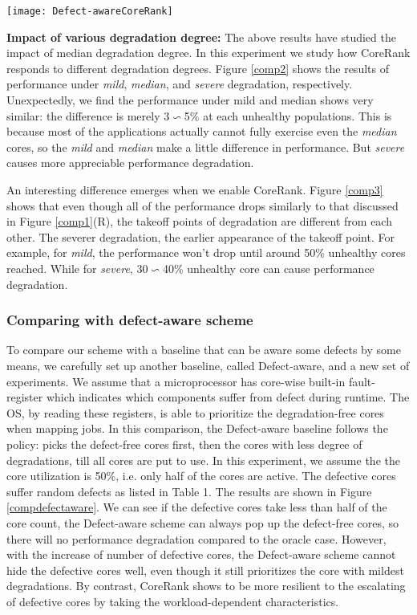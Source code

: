 \begin{figure*}[t]
 \centering
  \texttt{[image: Defect-awareCoreRank]}\\
\caption{Performance comparison between conventional Defect-aware scheme (L) and  CoreRank (R)}
\label{compdefectaware}
\end{figure*}

\textbf{Impact of various degradation degree:} The above results have studied the impact of median degradation degree. In this experiment we study how CoreRank responds to different degradation degrees. Figure \ref{comp2} shows the results of performance under \emph{mild}, \emph{median}, and \emph{severe} degradation, respectively.  Unexpectedly, we find the performance under mild and median shows very similar: the difference is merely 3$\backsim$5\% at each unhealthy populations. This is because most of the applications actually cannot fully exercise even the \emph{median} cores, so the \emph{mild} and \emph{median} make a little difference in performance.    But \emph{severe} causes more appreciable performance degradation.

An interesting difference emerges when we enable CoreRank.  Figure \ref{comp3} shows that even though all of the performance drops similarly to  that discussed in Figure \ref{comp1}(R),  the  takeoff points of degradation are different from each other.  The  severer degradation, the earlier appearance of the takeoff point.  For example, for \emph{mild}, the performance won't drop until around 50\% unhealthy cores reached. While for \emph{severe}, 30$\backsim$40\% unhealthy core can cause performance degradation.


\subsubsection{Comparing with defect-aware scheme}
To compare our scheme with a baseline that can be aware some defects by some means, we carefully set up another baseline, called Defect-aware, and a new set of experiments. We assume that a microprocessor has core-wise built-in fault-register which indicates which components suffer from defect during runtime. The OS, by reading these registers, is able to prioritize the degradation-free cores when mapping jobs.  In this comparison, the Defect-aware baseline follows the policy:  picks the defect-free cores first, then the cores with less degree of degradations, till all cores are put to use.  In this experiment, we assume the the core utilization is 50\%, i.e. only half of the cores are active.  The defective cores suffer random defects as listed in Table 1.  The results are shown in Figure \ref{compdefectaware}.  We can see if the defective cores take less than half of the core count, the Defect-aware scheme can always pop up the defect-free cores, so there will no performance degradation compared to the oracle case. However, with the increase of number of defective cores, the Defect-aware scheme cannot hide the defective cores well, even though it still prioritizes the core with mildest degradations.  By contrast, CoreRank shows to be more resilient to the escalating of defective cores by taking the workload-dependent characteristics.  

